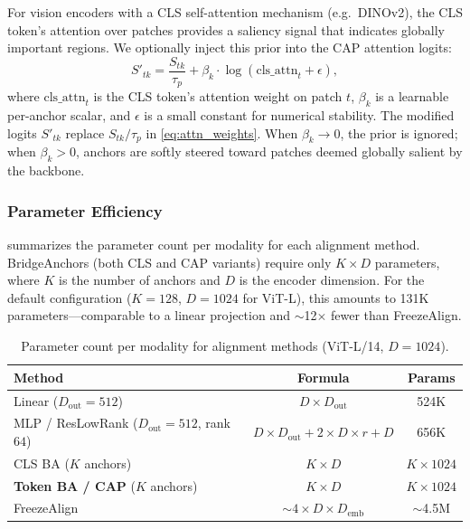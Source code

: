 For vision encoders with a CLS self-attention mechanism (e.g.\ DINOv2), the CLS token's attention over patches provides a saliency signal that indicates globally important regions.  We optionally inject this prior into the CAP attention logits:
\begin{equation}
    S'_{tk} = \frac{S_{tk}}{\tau_p} + \beta_k \cdot \log(\mathrm{cls\_attn}_t + \epsilon),
    \label{eq:cls_prior}
\end{equation}
where $\mathrm{cls\_attn}_t$ is the CLS token's attention weight on patch $t$, $\beta_k$ is a learnable per-anchor scalar, and $\epsilon$ is a small constant for numerical stability.  The modified logits $S'_{tk}$ replace $S_{tk}/\tau_p$ in \cref{eq:attn_weights}.  When $\beta_k \to 0$, the prior is ignored; when $\beta_k > 0$, anchors are softly steered toward patches deemed globally salient by the backbone.

\subsubsection{Parameter Efficiency}

 summarizes the parameter count per modality for each alignment method.  BridgeAnchors (both CLS and CAP variants) require only $K \times D$ parameters, where $K$ is the number of anchors and $D$ is the encoder dimension.  For the default configuration ($K = 128$, $D = 1024$ for ViT-L), this amounts to 131K parameters---comparable to a linear projection and $\sim$12$\times$ fewer than FreezeAlign.

\begin{table}[h]
\centering
\small
\caption{Parameter count per modality for alignment methods (ViT-L/14, $D = 1024$).}
\label{tab:param_count}
\begin{tabular}{lcc}
\toprule
Method & Formula & Params \\
\midrule
Linear ($D_{\text{out}} = 512$) & $D \times D_{\text{out}}$ & 524K \\
MLP / ResLowRank ($D_{\text{out}} = 512$, rank $64$) & $D \times D_{\text{out}} + 2 \times D \times r + D$ & 656K \\
CLS BA ($K$ anchors) & $K \times D$ & $K \times 1024$ \\
\textbf{Token BA / CAP} ($K$ anchors) & $K \times D$ & $K \times 1024$ \\
FreezeAlign & $\sim 4 \times D \times D_{\text{emb}}$ & $\sim$4.5M \\
\bottomrule
\end{tabular}
\end{table}

